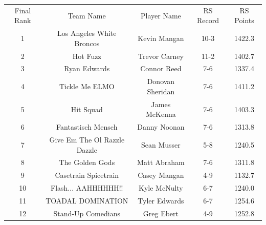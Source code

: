 \documentclass[11pt,letterpaper]{article}
\begin{document}
\newpage
{}
\vspace{-25pt}
\begin{table} [h]
\begin{center}
\begin{tabular} { c c c c c }
\\ Final Rank & Team Name & Player Name & RS Record & RS Points
\\ 1 & Los Angeles White Broncos & Kevin Mangan & 10-3 & 1422.3
\\ 2 & Hot Fuzz & Trevor Carney & 11-2 & 1402.7
\\ 3 & Ryan Edwards & Connor Reed & 7-6 & 1337.4
\\ 4 & Tickle Me ELMO & Donovan Sheridan & 7-6 & 1411.2
\\ 5 & Hit Squad & James McKenna & 7-6 & 1403.3
\\ 6 & Fantastisch Mensch & Danny Noonan & 7-6 & 1313.8
\\ 7 & Give Em The Ol Razzle Dazzle & Sean Musser & 5-8 & 1240.5
\\ 8 & The Golden Gods & Matt Abraham & 7-6 & 1311.8
\\ 9 & Casetrain Spicetrain & Casey Mangan & 4-9 & 1132.7
\\ 10 & Flash... AAHHHHHH!! & Kyle McNulty & 6-7 & 1240.0
\\ 11 & TOADAL DOMINATION & Tyler Edwards & 6-7 & 1254.6
\\ 12 & Stand-Up Comedians & Greg Ebert & 4-9 & 1252.8
\end{tabular}
\end{center}
\end{table}
\end{document}
